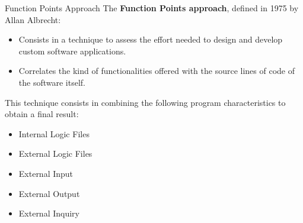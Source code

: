 \documentclass{../common/latex_classes/pdf_presentation}
\begin{document}
	\begin{frame}{Function Points Approach}
		The \textbf{Function Points approach}, defined in 1975 by Allan Albrecht:
		\begin{itemize}
			\item Consists in a technique to assess the effort needed to design and develop custom software applications.
			\item Correlates the kind of functionalities offered with the source lines of code of the software itself.
		\end{itemize}
		\medskip
		This technique consists in combining the following program characteristics to obtain a final result:
		\begin{itemize}
			\item Internal Logic Files
			\item External Logic Files
			\item External Input
			\item External Output
			\item External Inquiry
		\end{itemize}
	\end{frame}
\end{document}

